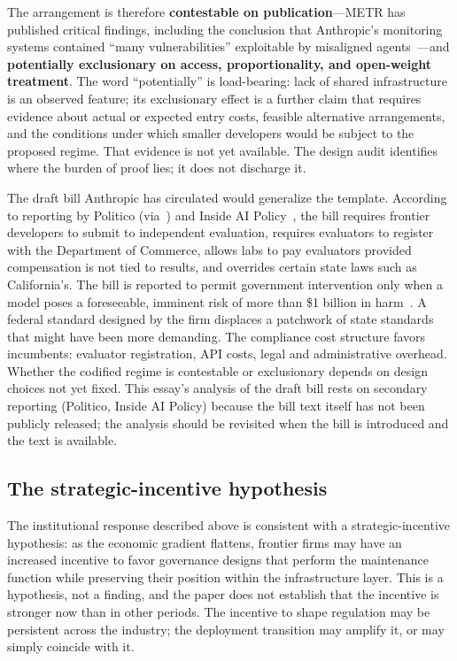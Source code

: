 The arrangement is therefore \textbf{contestable on publication}---METR has published critical findings, including the conclusion that Anthropic's monitoring systems contained ``many vulnerabilities'' exploitable by misaligned agents~\cite{metr2026b}---and \textbf{potentially exclusionary on access, proportionality, and open-weight treatment}. The word ``potentially'' is load-bearing: lack of shared infrastructure is an observed feature; its exclusionary effect is a further claim that requires evidence about actual or expected entry costs, feasible alternative arrangements, and the conditions under which smaller developers would be subject to the proposed regime. That evidence is not yet available. The design audit identifies where the burden of proof lies; it does not discharge it.

The draft bill Anthropic has circulated would generalize the template. According to reporting by Politico (via~\cite{wifc2026}) and Inside AI Policy~\cite{insideaipolicy2026}, the bill requires frontier developers to submit to independent evaluation, requires evaluators to register with the Department of Commerce, allows labs to pay evaluators provided compensation is not tied to results, and overrides certain state laws such as California's. The bill is reported to permit government intervention only when a model poses a foreseeable, imminent risk of more than \$1 billion in harm~\cite{wifc2026}. A federal standard designed by the firm displaces a patchwork of state standards that might have been more demanding. The compliance cost structure favors incumbents: evaluator registration, API costs, legal and administrative overhead. Whether the codified regime is contestable or exclusionary depends on design choices not yet fixed. This essay's analysis of the draft bill rests on secondary reporting (Politico, Inside AI Policy) because the bill text itself has not been publicly released; the analysis should be revisited when the bill is introduced and the text is available.

\subsection{The strategic-incentive hypothesis}

The institutional response described above is consistent with a strategic-incentive hypothesis: as the economic gradient flattens, frontier firms may have an increased incentive to favor governance designs that perform the maintenance function while preserving their position within the infrastructure layer. This is a hypothesis, not a finding, and the paper does not establish that the incentive is stronger now than in other periods. The incentive to shape regulation may be persistent across the industry; the deployment transition may amplify it, or may simply coincide with it.

